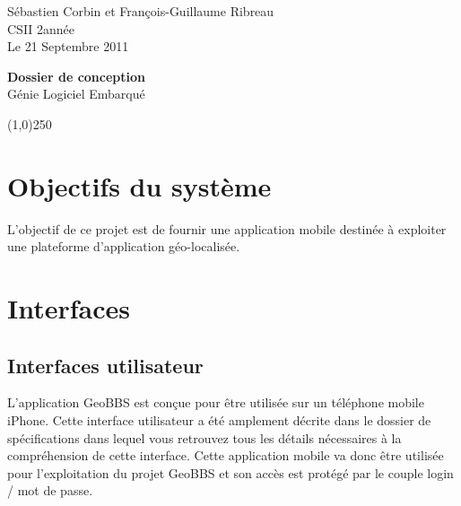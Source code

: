 \documentclass[a4paper,12pt]{report}
\begin{document}
  \begin{onehalfspace}

    \begin{titlepage}
    \setcounter{page}{0}
      \begin{center}
        Sébastien Corbin et François-Guillaume Ribreau\\
        CSII 2\ieme année\\
        Le 21 Septembre 2011\\
      \end{center}
      \hrulefill
      \vspace{7cm}
      \begin{center}
        \LARGE \textbf{Dossier de conception}\\
        \vspace{3cm}
        \normalsize Génie Logiciel Embarqué
      \end{center}

      \vspace{9,5cm}

      \begin{center}
      \line(1,0){250}
      \end{center}

      \begin{center}
      \tiny{\currfilename}
      \end{center}
      
    \end{titlepage}

\chapter{Objectifs du système}
L'objectif de ce projet est de fournir une application mobile destinée à exploiter une plateforme d'application géo-localisée.

\chapter{Interfaces}
\section{Interfaces utilisateur}
L'application GeoBBS est conçue pour être utilisée sur un téléphone mobile iPhone.
Cette interface utilisateur a été amplement décrite dans le dossier de spécifications dans lequel vous retrouvez tous les détails nécessaires à la compréhension de cette interface.
Cette application mobile va donc être utilisée pour l'exploitation du projet GeoBBS et son accès est protégé par le couple login / mot de passe.


\end{onehalfspace}
\end{document}
